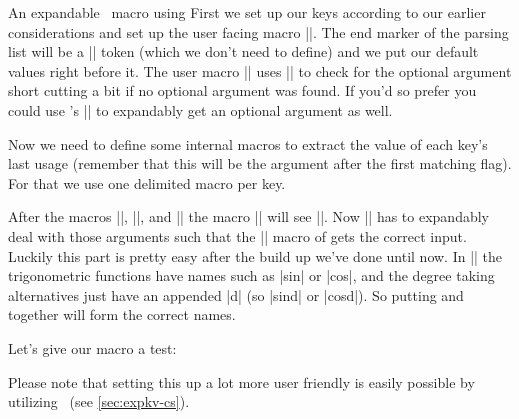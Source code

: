 \begin{example}{An expandable \kv\ macro using }
  First we set up our keys according to our earlier considerations and set up
  the user facing macro |\sine|. The end marker of the parsing list will be a
  |\sine@stop| token (which we don't need to define) and we put our default
  values right before it. The user macro |\sine| uses |\ekvoptargTF| to check
  for the optional argument short cutting a bit if no optional argument was
  found. If you'd so prefer you could use 's
  |\NewExpandableDocumentCommand| to expandably get an optional argument as
  well.
  \begin{enverb}
    \RequirePackage{xfp}
    \makeatletter
    \newcommand*\sine{\ekvoptargTF\sine@args{\sine@final{sin}{d}{3}}}
    \newcommand*\sine@args[2]
      {\ekvset{sine}{#1,internal}\rnd{3}\deg{d}\f{sin}\sine@stop{#2}}
  \end{enverb}

  Now we need to define some internal macros to extract the value of each key's
  last usage (remember that this will be the argument after the first matching
  flag). For that we use one delimited macro per key.
  After the macros |\sine@rnd|, |\sine@deg|, and |\sine@f| the macro
  |\sine@final| will see
  |\sine@final|. Now
  |\sine@final| has to expandably deal with those arguments such that the
  |\fpeval| macro of  gets the correct input. Luckily this part is
  pretty easy after the build up we've done until now. In |\fpeval| the
  trigonometric functions have names such as |sin| or |cos|, and the degree
  taking alternatives just have an appended |d| (so |sind| or |cosd|). So
  putting  and  together will form the correct
  names.
  \begin{enverb}
    \newcommand*\sine@final[4]{\fpeval{round(#1#2(#4),#3)}}
    \makeatother
  \end{enverb}
  Let's give our macro a test:
  \begin{enverb}[restore,inter=\def\RequirePackage#1{}]
    \par
    \par
    \par
    \edef\myval{}\texttt{\meaning\myval}
  \end{enverb}
\end{example}

Please note that setting this up a lot more user friendly is easily possible by
utilizing \expkvc\ (see \autoref{sec:expkv-cs}).
